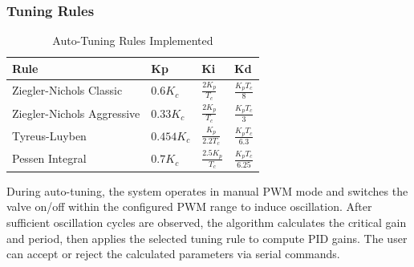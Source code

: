 \subsubsection{Tuning Rules}
\begin{table}[H]
\centering
\begin{tabular}{@{}llll@{}}
\toprule
\textbf{Rule} & \textbf{Kp} & \textbf{Ki} & \textbf{Kd} \\
\midrule
Ziegler-Nichols Classic & $0.6 K_c$ & $\frac{2K_p}{T_c}$ & $\frac{K_p T_c}{8}$ \\
Ziegler-Nichols Aggressive & $0.33 K_c$ & $\frac{2K_p}{T_c}$ & $\frac{K_p T_c}{3}$ \\
Tyreus-Luyben & $0.454 K_c$ & $\frac{K_p}{2.2 T_c}$ & $\frac{K_p T_c}{6.3}$ \\
Pessen Integral & $0.7 K_c$ & $\frac{2.5 K_p}{T_c}$ & $\frac{K_p T_c}{6.25}$ \\
\bottomrule
\end{tabular}
\caption{Auto-Tuning Rules Implemented}
\end{table}

During auto-tuning, the system operates in manual PWM mode and switches the valve on/off within the configured PWM range to induce oscillation. After sufficient oscillation cycles are observed, the algorithm calculates the critical gain and period, then applies the selected tuning rule to compute PID gains. The user can accept or reject the calculated parameters via serial commands.
